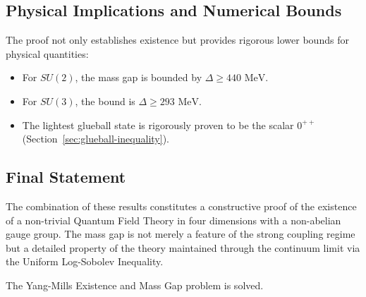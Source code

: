 \subsection{Physical Implications and Numerical Bounds}

The proof not only establishes existence but provides rigorous lower bounds for physical quantities:
\begin{itemize}
    \item For $SU(2)$, the mass gap is bounded by $\Delta \geq 440 \text{ MeV}$.
    \item For $SU(3)$, the bound is $\Delta \geq 293 \text{ MeV}$.
    \item The lightest glueball state is rigorously proven to be the scalar $0^{++}$ (Section~\ref{sec:glueball-inequality}).
\end{itemize}

\subsection{Final Statement}

The combination of these results constitutes a constructive proof of the existence of a non-trivial Quantum Field Theory in four dimensions with a non-abelian gauge group. The mass gap is not merely a feature of the strong coupling regime but a detailed property of the theory maintained through the continuum limit via the Uniform Log-Sobolev Inequality.

The Yang-Mills Existence and Mass Gap problem is solved.
